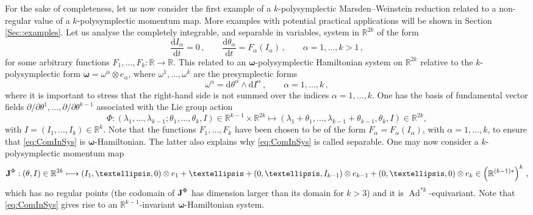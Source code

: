 \documentclass[11pt]{article}
\theoremstyle{plain}
\theoremstyle{definition}
\newcommand{\bomega}{{\boldsymbol{\omega}}}
\renewcommand{\d}{\mathrm{d}}
\DeclareMathOperator{\Ad}{Ad}
\def\d{\mathrm{d}}
\numberwithin{equation}{section}
\begin{document}
For the sake of completeness, let us now consider the first example of a $k$-polysymplectic Marsden--Weinstein reduction related to a non-regular value of a $k$-polysymplectic momentum map. More examples with potential practical applications will be shown in Section \ref{Sec::examples}. Let us analyse  the completely integrable, and separable in variables, system in $\mathbb{R}^{2k}$ of the form
\begin{equation}\label{eq:ComInSys}
\frac{\d I_\alpha}{\d t}=0\,,\qquad \frac{\d\theta_\alpha}{\d t} = F_\alpha(I_\alpha)\,,\qquad \alpha=1,\ldots,k>1\,,
\end{equation}
for some arbitrary functions $F_1,\ldots,F_k:
\mathbb{R}
\rightarrow \mathbb{R}$. 
This related to an $\bomega$-polysymplectic Hamiltonian system on $\mathbb{R}^{2k}$ relative to the $k$-polysymplectic form $\bomega = \omega^\alpha\otimes e_\alpha$, where $\omega^1,\ldots,\omega^k$ are the presymplectic forms
$$
\omega^\alpha = \d\theta^\alpha\wedge \d I^\alpha\,,\qquad \alpha=1,\ldots,k\,,
$$
where it is important to stress that the right-hand side is not summed over the indices $\alpha=1,\ldots,k$. 
One has the basis of fundamental vector fields  $\partial/\partial \theta^1,\ldots,\partial/\partial \theta^{k-1}$ associated with the Lie group action
$$
\Phi:(\lambda_1,\ldots,\lambda_{k-1};\theta_1,\ldots,\theta_k,I)\in \mathbb{R}^{k-1}\times\mathbb{R}^{2k}\mapsto (\lambda_1+\theta_1,\ldots,\lambda_{k-1}+\theta_{k-1},\theta_k,I)\in\mathbb{R}^{2k},
$$
with $I=(I_1,\ldots,I_k)\in \mathbb{R}^k$.  Note that the functions $F_1,\ldots,F_k$ have been chosen to be of the form $F_\alpha=F_\alpha(I_\alpha)$, with $\alpha=1,\ldots,k$, to ensure that \eqref{eq:ComInSys} is $\bm\omega$-Hamiltonian. The latter also explains why \eqref{eq:ComInSys} is called separable. One may now consider a $k$-polysymplectic momentum map
\[
{\bf J}^{\Phi}:(\theta,I)\in \mathbb{R}^{2k}\longmapsto (I_1,\ldots,0)\otimes e_1+\ldots+(0,\ldots,I_{k-1})\otimes e_{k-1}+(0,\ldots,0)\otimes e_{k} \in \left(\mathbb{R}^{(k-1)*}\right)^k\,,
\]
which has no regular points (the codomain of ${\bf J}^\Phi$ has dimension larger than its domain for $k>3$) and it is $\Ad^{*k}$-equivariant. 
Note that \eqref{eq:ComInSys} gives rise to an $\mathbb{R}^{k-1}$-invariant $\bomega$-Hamiltonian system. 
\end{document}
